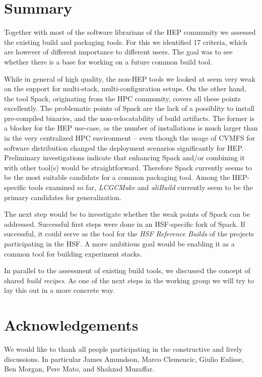 \documentclass[12pt,a4paper]{article}
\begin{document}
\section{Summary}
Together with most of the software librarians of the HEP community we assessed the existing build and packaging tools. For this we identified 17 criteria, which are however of different importance to different users. The goal was to see whether there is a base for working on a future common build tool. 

While in general of high quality, the non-HEP tools we looked at seem very weak on the support for multi-stack, multi-configuration setups. On the other hand, the tool Spack, originating from the HPC community, covers all these points excellently. The problematic points of Spack are the lack of a possiblity to install pre-compiled binaries, and the non-relocatability of build artifacts. The former is a blocker for the HEP use-case, as the number of installations is much larger than in the very centralized HPC environment -- even though the usage of CVMFS for software distribution changed the deployment scenarios significantly for HEP. Preliminary investigations indicate that enhancing Spack and/or combining it with other tool(s) would be straightforward. Therefore Spack currently seems to be the most suitable candidate for a common packaging tool. Among the HEP-specific tools examined so far, \emph{LCGCMake} and \emph{aliBuild} currently seem to be the primary candidates for generalization. 

The next step would be to investigate whether the weak points of Spack can be addressed. Successful first steps were done in an HSF-specific fork of Spack. If successful, it could serve as the tool for the \emph{HSF Reference Builds} of the projects participating in the HSF. A more ambitious goal would be enabling it as a common tool for building experiment stacks.

In parallel to the assessment of existing build tools, we discussed the concept of shared \emph{build recipes}. As one of the next steps in the working group we will try to lay this out in a more concrete way.

\section*{Acknowledgements}
We would like to thank all people participating in the constructive and lively discussions. In particular James Amundson, Marco Clemencic, Giulio Eulisse, Ben Morgan, Pere Mato, and Shahzad Muzaffar.
\end{document}
